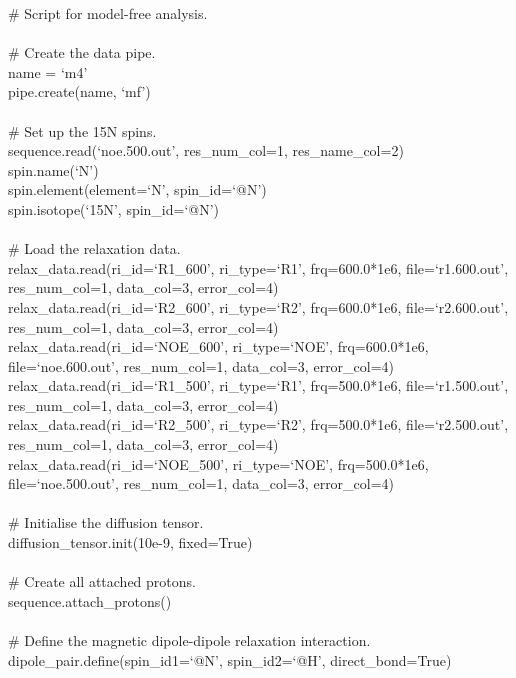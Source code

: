 \begin{htmlonly}
\begin{htmlonly}
\begin{exampleenv}
\# Script for model-free analysis. \\
 \\
\# Create the data pipe. \\
name = `m4' \\
pipe.create(name, `mf') \\
 \\
\# Set up the 15N spins. \\
sequence.read(`noe.500.out', res\_num\_col=1, res\_name\_col=2) \\
spin.name(`N') \\
spin.element(element=`N', spin\_id=`@N') \\
spin.isotope(`15N', spin\_id=`@N') \\
 \\
\# Load the relaxation data. \\
relax\_data.read(ri\_id=`R1\_600',  ri\_type=`R1',  frq=600.0*1e6, file=`r1.600.out', res\_num\_col=1, data\_col=3, error\_col=4) \\
relax\_data.read(ri\_id=`R2\_600',  ri\_type=`R2',  frq=600.0*1e6, file=`r2.600.out', res\_num\_col=1, data\_col=3, error\_col=4) \\
relax\_data.read(ri\_id=`NOE\_600', ri\_type=`NOE', frq=600.0*1e6, file=`noe.600.out', res\_num\_col=1, data\_col=3, error\_col=4) \\
relax\_data.read(ri\_id=`R1\_500',  ri\_type=`R1',  frq=500.0*1e6, file=`r1.500.out', res\_num\_col=1, data\_col=3, error\_col=4) \\
relax\_data.read(ri\_id=`R2\_500',  ri\_type=`R2',  frq=500.0*1e6, file=`r2.500.out', res\_num\_col=1, data\_col=3, error\_col=4) \\
relax\_data.read(ri\_id=`NOE\_500', ri\_type=`NOE', frq=500.0*1e6, file=`noe.500.out', res\_num\_col=1, data\_col=3, error\_col=4) \\
 \\
\# Initialise the diffusion tensor. \\
diffusion\_tensor.init(10e-9, fixed=True) \\
 \\
\# Create all attached protons. \\
sequence.attach\_protons() \\
 \\
\# Define the magnetic dipole-dipole relaxation interaction. \\
dipole\_pair.define(spin\_id1=`@N', spin\_id2=`@H', direct\_bond=True) \\

\end{exampleenv}
\end{htmlonly}
\end{htmlonly}
